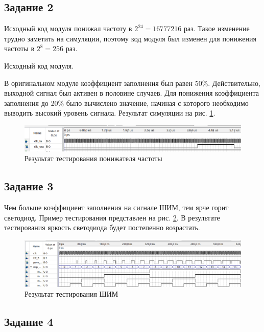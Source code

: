 \documentclass[a4paper,14pt]{article}
\begin{document}
	\subsection{Задание 2}
	
	Исходный код модуля понижал частоту в $2^{24} = 16777216$ раз.
	Такое изменение трудно заметить на симуляции, поэтому код модуля был изменен для понижения частоты в $2^8 = 256$ раз.
	
	Исходный код модуля.
	
	
	В оригинальном модуле коэффициент заполнения был равен 50\%.
	Действительно, выходной сигнал был активен в половине случаев.
	Для понижения коэффициента заполнения до 20\% было вычислено значение, начиная с которого необходимо выводить высокий уровень сигнала.
	Результат симуляции на рис. \ref{fig:z3}.
	
	\begin{figure}[H]
		\centering
		\includegraphics[width=\linewidth]{images/z3}
		\caption{Результат тестирования понижателя частоты}
		\label{fig:z3}
	\end{figure}

	\subsection{Задание 3}

	Чем больше коэффициент заполнения на сигнале ШИМ, тем ярче горит светодиод.
	Пример тестирования представлен на рис. \ref{fig:z4}.
	В результате тестирования яркость светодиода будет постепенно возрастать.
	
	\begin{figure}[H]
		\centering
		\includegraphics[width=\linewidth]{images/z4}
		\caption{Результат тестирования ШИМ}
		\label{fig:z4}
	\end{figure}

	\subsection{Задание 4}
	
\end{document}

